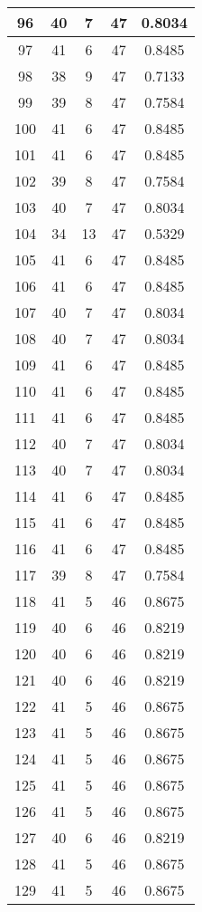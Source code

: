 \documentclass[letterpaper, 12pt]{article}
\begin{document}
\begin{longtable}{|c|c|c|c|c|}
\hline
96 & 40 & 7 & 47 & 0.8034 \\
\hline
97 & 41 & 6 & 47 & 0.8485 \\
\hline
98 & 38 & 9 & 47 & 0.7133 \\
\hline
99 & 39 & 8 & 47 & 0.7584 \\
\hline
100 & 41 & 6 & 47 & 0.8485 \\
\hline
101 & 41 & 6 & 47 & 0.8485 \\
\hline
102 & 39 & 8 & 47 & 0.7584 \\
\hline
103 & 40 & 7 & 47 & 0.8034 \\
\hline
104 & 34 & 13 & 47 & 0.5329 \\
\hline
105 & 41 & 6 & 47 & 0.8485 \\
\hline
106 & 41 & 6 & 47 & 0.8485 \\
\hline
107 & 40 & 7 & 47 & 0.8034 \\
\hline
108 & 40 & 7 & 47 & 0.8034 \\
\hline
109 & 41 & 6 & 47 & 0.8485 \\
\hline
110 & 41 & 6 & 47 & 0.8485 \\
\hline
111 & 41 & 6 & 47 & 0.8485 \\
\hline
112 & 40 & 7 & 47 & 0.8034 \\
\hline
113 & 40 & 7 & 47 & 0.8034 \\
\hline
114 & 41 & 6 & 47 & 0.8485 \\
\hline
115 & 41 & 6 & 47 & 0.8485 \\
\hline
116 & 41 & 6 & 47 & 0.8485 \\
\hline
117 & 39 & 8 & 47 & 0.7584 \\
\hline
118 & 41 & 5 & 46 & 0.8675 \\
\hline
119 & 40 & 6 & 46 & 0.8219 \\
\hline
120 & 40 & 6 & 46 & 0.8219 \\
\hline
121 & 40 & 6 & 46 & 0.8219 \\
\hline
122 & 41 & 5 & 46 & 0.8675 \\
\hline
123 & 41 & 5 & 46 & 0.8675 \\
\hline
124 & 41 & 5 & 46 & 0.8675 \\
\hline
125 & 41 & 5 & 46 & 0.8675 \\
\hline
126 & 41 & 5 & 46 & 0.8675 \\
\hline
127 & 40 & 6 & 46 & 0.8219 \\
\hline
128 & 41 & 5 & 46 & 0.8675 \\
\hline
129 & 41 & 5 & 46 & 0.8675 \\

\end{longtable}
\end{document}
